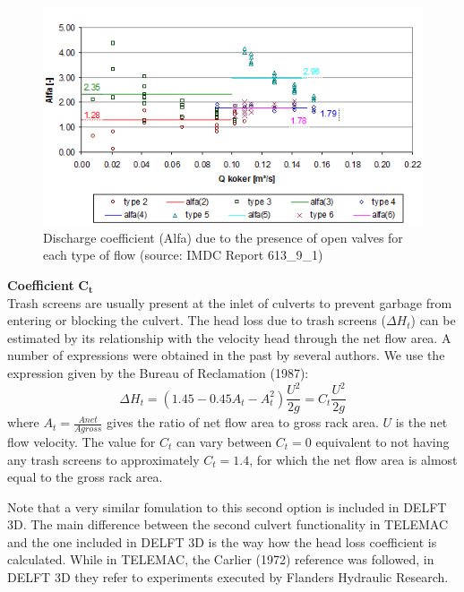 \begin{figure}[H]
\begin{center}
  \includegraphics[scale=1]{culvert_fig8.png}
\end{center}
\caption{Discharge coefficient (Alfa) due to the presence of open valves for 
each type of flow (source: IMDC Report 613\_9\_1)}
\label{fig:culvert_fig8}
\end{figure}

\textbf{Coefficient} $\mathbf{C_t}$\\

Trash screens are usually present at the inlet of culverts to prevent garbage 
from entering or blocking the culvert. The head loss due to trash screens 
($\Delta H_t$) can be estimated by its relationship with the velocity 
head through the net flow area. 
A number of expressions were obtained in the past by several authors. 
We use the expression given by the Bureau of Reclamation (1987):
\begin{equation}
\Delta H_t = (1.45-0.45A_t-A_t^2)\dfrac{U^2}{2g} = C_t \dfrac{U^2}{2g}
\end{equation}
where $A_t=\frac{Anet}{Agross}$ gives the ratio of net flow area to gross rack area. 
$U$ is the net flow velocity. The value for $C_t$ can vary between $C_t= 0$ equivalent 
to not having any trash screens to approximately $C_t= 1.4$, for which the net 
flow area is almost equal to the gross rack area.

Note that a very similar fomulation to this second option is included in DELFT 3D.
The main difference between the second culvert functionality in TELEMAC and the one 
included in DELFT 3D is the way how the head loss coefficient is calculated. 
While in TELEMAC, the Carlier (1972) reference was followed, in DELFT 3D they refer 
to experiments executed by Flanders Hydraulic Research. 


